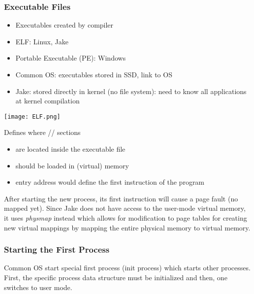 \subsubsection{Executable Files}
\begin{itemize}
    \item Executables created by compiler
    \item ELF: Linux, Jake
    \item Portable Executable (PE): Windows
    \item Common OS: executables stored in SSD, link to OS
    \item Jake: stored directly in kernel (no file system): need to know all applications at kernel compilation
\end{itemize}
\newpar{}
\newpar{}
\begin{center}
    \texttt{[image: ELF.png]}
\end{center}
Defines where // sections
\begin{itemize}
    \item are located inside the executable file
    \item should be loaded in (virtual) memory
    \item {} entry address would define the first instruction of the program
\end{itemize}

\newpar{}

After starting the new process, its first instruction will cause a page fault (no mapped yet). Since Jake does not have access to the user-mode virtual memory, it uses \textit{physmap} instead which allows for modification to page tables for creating new virtual mappings by mapping the entire physical memory to virtual memory.


\subsubsection{Starting the First Process}
Common OS start special first process (init process) which starts other processes. First, the specific process data structure must be initialized and then, one switches to user mode.

